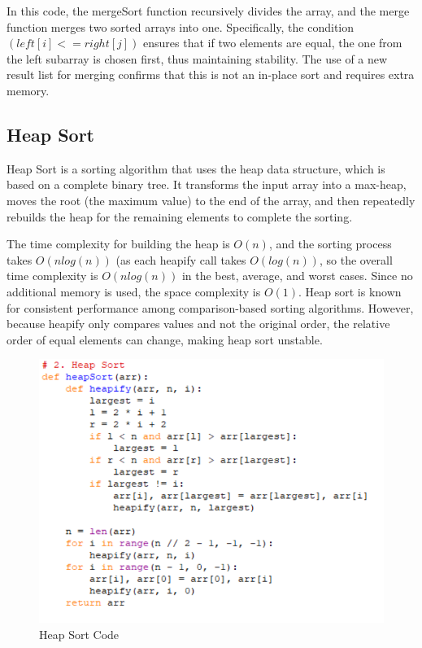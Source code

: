 \documentclass[sigconf]{acmart}
\begin{document}
In this code, the mergeSort function recursively divides the array, and the merge function merges two sorted arrays into one. Specifically, the condition $(left[i] <= right[j])$ ensures that if two elements are equal, the one from the left subarray is chosen first, thus maintaining stability. The use of a new result list for merging confirms that this is not an in-place sort and requires extra memory.
\subsection {Heap Sort}
Heap Sort is a sorting algorithm that uses the heap data structure, which is based on a complete binary tree. It transforms the input array into a max-heap, moves the root (the maximum value) to the end of the array, and then repeatedly rebuilds the heap for the remaining elements to complete the sorting.

The time complexity for building the heap is $O(n)$, and the sorting process takes $O(nlog(n))$ (as each heapify call takes $O(log(n))$, so the overall time complexity is $O(nlog(n))$ in the best, average, and worst cases. Since no additional memory is used, the space complexity is $O(1)$. Heap sort is known for consistent performance among comparison-based sorting algorithms.
However, because heapify only compares values and not the original order, the relative order of equal elements can change, making heap sort unstable.

\begin{figure}[H]
\centering
\includegraphics[width=0.85\linewidth]{figures/002.pdf}
\vspace{-0.3cm}
\caption{Heap Sort Code}  
\vspace{-0.35cm}
\label{fig:proportion}
\end{figure}
\end{document}
